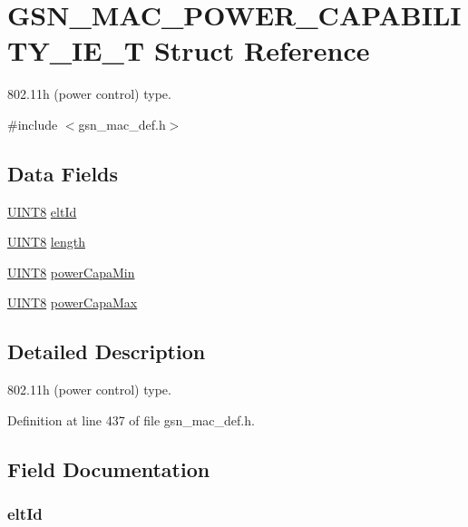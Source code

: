 \hypertarget{a00122}{
\section{GSN\_\-MAC\_\-POWER\_\-CAPABILITY\_\-IE\_\-T Struct Reference}
\label{a00122}
}


802.11h (power control) type.  




{\ttfamily \#include $<$gsn\_\-mac\_\-def.h$>$}

\subsection*{Data Fields}
\begin{DoxyCompactItemize}
\item 
\hyperlink{a00660_gab27e9918b538ce9d8ca692479b375b6a}{UINT8} \hyperlink{a00122_a51c62ca06caf5fff834b6a2030dd5cb0}{eltId}
\item 
\hyperlink{a00660_gab27e9918b538ce9d8ca692479b375b6a}{UINT8} \hyperlink{a00122_ae360fb41f422c7c83b87d9af070cbd31}{length}
\item 
\hyperlink{a00660_gab27e9918b538ce9d8ca692479b375b6a}{UINT8} \hyperlink{a00122_a2dbe867d2b3865e39d436bec0311ef0c}{powerCapaMin}
\item 
\hyperlink{a00660_gab27e9918b538ce9d8ca692479b375b6a}{UINT8} \hyperlink{a00122_a789133b7032bc6828b54c3fdd3ce84c0}{powerCapaMax}
\end{DoxyCompactItemize}


\subsection{Detailed Description}
802.11h (power control) type. 

Definition at line 437 of file gsn\_\-mac\_\-def.h.



\subsection{Field Documentation}
\hypertarget{a00122_a51c62ca06caf5fff834b6a2030dd5cb0}{
\subsubsection[{eltId}]{ {\bf eltId}}}
\label{a00122_a51c62ca06caf5fff834b6a2030dd5cb0}


